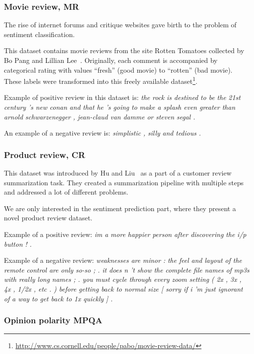     \subsubsection{Movie review, MR}
    
    The rise of internet forums and critique websites gave birth to the problem of sentiment classification.
    
    This dataset contains movie reviews from the site Rotten Tomatoes collected by Bo Pang and Lillian Lee~\cite{pang2002thumbs}.
    Originally, each comment is accompanied by categorical rating with values ``fresh'' (good movie) to ``rotten'' (bad movie). 
    These labels were transformed into this freely available dataset\footnote{\url{http://www.cs.cornell.edu/people/pabo/movie-review-data/}}.
    
    Example of positive review in this dataset is: \emph{the rock is destined to be the 21st century 's new conan and that he 's going to make a splash even greater than arnold schwarzenegger , jean-claud van damme or steven segal .}

    An example of a negative review is: \emph{simplistic , silly and tedious .}
    
    \subsubsection{Product review, CR}
    
    This dataset was introduced by Hu and Liu~\cite{hu2004mining} as a part of a customer review summarization task. 
    They created a summarization pipeline with multiple steps and addressed a lot of different problems. 
    
    We are only interested in the sentiment prediction part, where they present a novel product review dataset.
    
    Example of a positive review:
    \emph{im a more happier person after discovering the i/p button ! .}

    Example of a negative review:
    \emph{weaknesses are minor : the feel and layout of the remote control are only so-so ; . it does n 't show the complete file names of mp3s with really long names ; . you must cycle through every zoom setting ( 2x , 3x , 4x , 1/2x , etc . ) before getting back to normal size [ sorry if i 'm just ignorant of a way to get back to 1x quickly ] .}

    \subsubsection{Opinion polarity MPQA}

